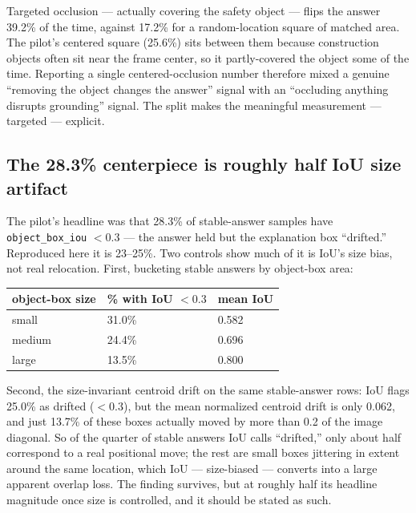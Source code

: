Targeted occlusion --- actually covering the safety object --- flips the answer 39.2\% of the time,
against 17.2\% for a random-location square of matched area. The pilot's centered square (25.6\%) sits
between them because construction objects often sit near the frame center, so it partly-covered the
object some of the time. Reporting a single centered-occlusion number therefore mixed a genuine
``removing the object changes the answer'' signal with an ``occluding anything disrupts grounding''
signal. The split makes the meaningful measurement --- targeted --- explicit.

\subsection{The 28.3\% centerpiece is roughly half IoU size artifact}

The pilot's headline was that 28.3\% of stable-answer samples have \texttt{object\_box\_iou} $< 0.3$ ---
the answer held but the explanation box ``drifted.'' Reproduced here it is 23--25\%. Two controls show
much of it is IoU's size bias, not real relocation. First, bucketing stable answers by object-box area:

\begin{center}
\begin{tabular}{p{3.6cm}p{3.6cm}p{3.0cm}}
\toprule
\textbf{object-box size} & \textbf{\% with IoU $<0.3$} & \textbf{mean IoU} \\
\midrule
small  & 31.0\% & 0.582 \\
medium & 24.4\% & 0.696 \\
large  & 13.5\% & 0.800 \\
\bottomrule
\end{tabular}
\label{tab:p24-size}
\end{center}

Second, the size-invariant centroid drift on the same stable-answer rows: IoU flags 25.0\% as drifted
($<0.3$), but the mean normalized centroid drift is only 0.062, and just 13.7\% of these boxes actually
moved by more than 0.2 of the image diagonal. So of the quarter of stable answers IoU calls
``drifted,'' only about half correspond to a real positional move; the rest are small boxes jittering
in extent around the same location, which IoU --- size-biased --- converts into a large apparent overlap
loss. The finding survives, but at roughly half its headline magnitude once size is controlled, and it
should be stated as such.

